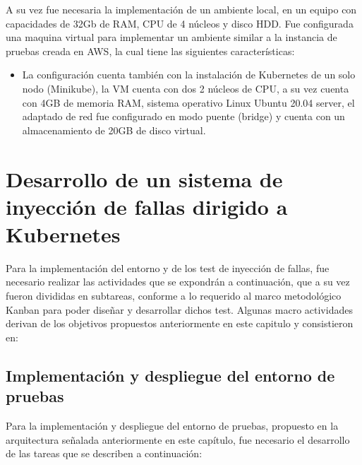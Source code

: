 \par A su vez fue necesaria la implementación de un ambiente local, en un equipo con capacidades de 32Gb de RAM, CPU de 4 núcleos y disco HDD. Fue configurada una maquina virtual para implementar un ambiente similar a la instancia de pruebas creada en AWS, la cual tiene las siguientes características:
\begin{itemize}
    \item La configuración cuenta también con la instalación de Kubernetes de un solo nodo (Minikube), la VM cuenta con dos 2 núcleos de CPU, a su vez cuenta con 4GB de memoria RAM, sistema operativo Linux Ubuntu 20.04 server, el adaptado de red fue configurado en modo puente (bridge) y cuenta con un almacenamiento de 20GB de disco virtual.
\end{itemize}

\section{Desarrollo de un sistema de inyecci\'on de fallas dirigido a Kubernetes}

\par Para la implementación del entorno y de los test de inyección de fallas, fue necesario realizar las actividades que se expondrán a continuación, que a su vez fueron divididas en subtareas, conforme a lo requerido al marco metodológico Kanban para poder diseñar y desarrollar dichos test. Algunas macro actividades derivan de los objetivos propuestos anteriormente en este capitulo y consistieron en:

\subsection{Implementación y despliegue del entorno de pruebas}

\par Para la implementación y despliegue del entorno de pruebas, propuesto en la arquitectura señalada anteriormente en este cap\'itulo, fue necesario el desarrollo de las tareas que se describen a continuación:\\

